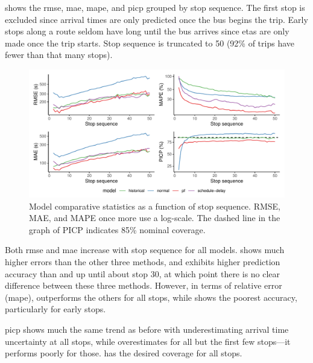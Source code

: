  shows the \gls{rmse}, \gls{mae}, \gls{mape}, and \gls{picp} grouped by stop sequence. The first stop is excluded since arrival times are only predicted once the bus begins the trip. Early stops along a route seldom have long until the bus arrives since \glspl{eta} are only made once the trip starts. Stop sequence is truncated to 50 (92\% of trips have fewer than that many stops).


\begin{knitrout}\small
{}\color{fgcolor}\begin{figure}
\includegraphics[width=\textwidth]{figure/model_results_rmse_stopn-1} \caption[Model comparative statistics as a function of stop sequence]{Model comparative statistics as a function of stop sequence. RMSE, MAE, and MAPE once more use a log-scale. The dashed line in the graph of PICP indicates 85\% nominal coverage.}\label{fig:model_results_rmse_stopn}
\end{figure}


\end{knitrout}

Both \gls{rmse} and \gls{mae} increase with stop sequence for all models. \Fnorm{} shows much higher errors than the other three methods, and \Fpf{} exhibits higher prediction accuracy than \Fhist{} and \Fsched{} up until about stop 30, at which point there is no clear difference between these three methods. However, in terms of relative error (\gls{mape}), \Fpf{} outperforms the others for all stops, while \Fhist{} shows the poorest accuracy, particularly for early stops.


\Gls{picp} shows much the same trend as before with \Fpf{} underestimating arrival time uncertainty at all stops, while \Fnorm{} overestimates for all but the first few stops---it performs poorly for those. \Fhist{} has the desired coverage for all stops.


